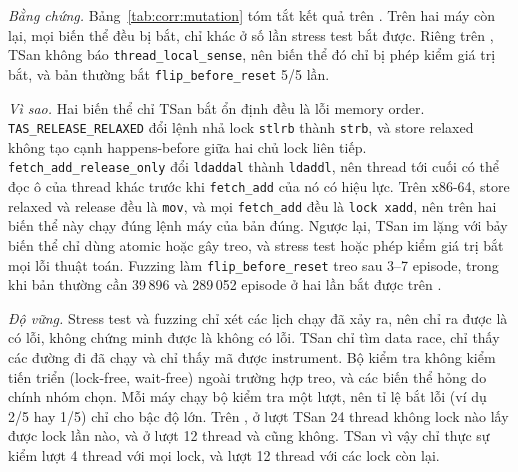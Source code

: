 \emph{Bằng chứng.} Bảng~\ref{tab:corr:mutation} tóm tắt kết quả trên . Trên hai máy còn
lại, mọi biến thể đều bị bắt, chỉ khác ở số lần stress test bắt được. Riêng trên , TSan
không báo \texttt{thread\_local\_sense}, nên biến thể đó chỉ bị phép kiểm giá trị bắt, và bản thường bắt
\texttt{flip\_before\_reset} 5/5 lần.

\emph{Vì sao.} Hai biến thể chỉ TSan bắt ổn định đều là lỗi memory order. \texttt{TAS\_RELEASE\_RELAXED}
đổi lệnh nhả lock \texttt{stlrb} thành \texttt{strb}, và store relaxed không tạo cạnh happens-before giữa
hai chủ lock liên tiếp. \texttt{fetch\_add\_release\_only} đổi \texttt{ldaddal} thành \texttt{ldaddl}, nên
thread tới cuối có thể đọc ô của thread khác trước khi \texttt{fetch\_add} của nó có hiệu lực. Trên
x86-64, store relaxed và release đều là \texttt{mov}, và mọi \texttt{fetch\_add} đều là \texttt{lock
xadd}, nên trên  hai biến thể này chạy đúng lệnh máy của bản đúng. Ngược lại, TSan im
lặng với bảy biến thể chỉ dùng atomic hoặc gây treo, và stress test hoặc phép kiểm giá trị bắt mọi lỗi
thuật toán. Fuzzing làm \texttt{flip\_before\_reset} treo sau 3--7 episode, trong khi bản thường cần
39\,896 và 289\,052 episode ở hai lần bắt được trên .

\emph{Độ vững.} Stress test và fuzzing chỉ xét các lịch chạy đã xảy ra, nên chỉ ra được là có lỗi, không
chứng minh được là không có lỗi. TSan chỉ tìm data race, chỉ thấy các đường đi đã chạy và chỉ thấy mã được
instrument. Bộ kiểm tra không kiểm tiến triển (lock-free, wait-free) ngoài trường hợp treo, và các biến
thể hỏng do chính nhóm chọn. Mỗi máy chạy bộ kiểm tra một lượt, nên tỉ lệ bắt lỗi (ví dụ 2/5 hay 1/5)
chỉ cho bậc độ lớn. Trên , ở lượt TSan 24 thread không lock nào lấy được lock lần nào,
và ở lượt 12 thread  và  cũng không. TSan vì vậy chỉ thực sự kiểm lượt
4 thread với mọi lock, và lượt 12 thread với các lock còn lại.
